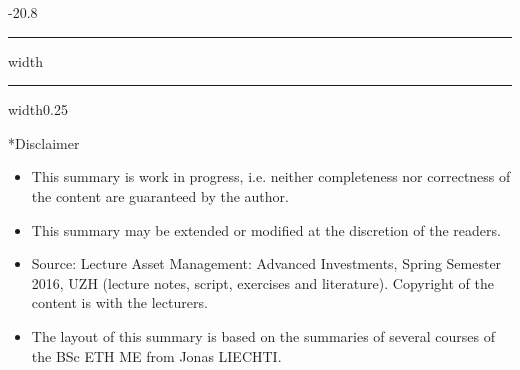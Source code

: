 \documentclass[a4paper,landscape,8pt,fleqn]{scrartcl}
\makeatletter
\newcommand{\SummaryTitle}{Asset Management: Advanced Investments}
\newcommand{\SummarySemester}{Spring Semester 2016}
\renewcommand{\section}{\@startsection{section}{1}{0mm}%
{-2\baselineskip}{0.8\baselineskip}%
{\hrule depth 0.2pt width\columnwidth\hrule depth1.5pt
width0.25\columnwidth\vspace*{1.2em}\Large\bfseries}}
\makeatother
\begin{document}
\begin{multicols*}{3}
\section*{Disclaimer}

\begin{itemize}
\item This summary is work in progress, i.e. neither completeness nor correctness of the content are guaranteed by the author.
\item This summary may be extended or modified at the discretion of the readers.
\item Source: Lecture \SummaryTitle, \SummarySemester, UZH (lecture notes, script, exercises and literature). Copyright of the content is with the lecturers.
\item The layout of this summary is based on the summaries of several courses of the BSc ETH ME from Jonas LIECHTI.
\end{itemize}

\end{multicols*}
\end{document}
